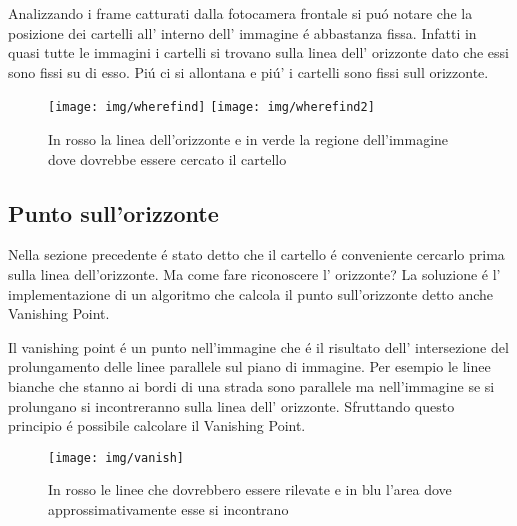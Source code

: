 		Analizzando i frame catturati dalla fotocamera frontale si pu\'o notare che la posizione dei cartelli all' interno dell' immagine \'e abbastanza fissa. Infatti in quasi tutte le immagini i cartelli si trovano sulla linea dell' orizzonte dato che essi sono fissi su di esso. Pi\'u ci si allontana e pi\'u' i cartelli sono fissi sull orizzonte.
		\begin{figure}[!ht]
			\centering
			\texttt{[image: img/wherefind]}
			\texttt{[image: img/wherefind2]}
			\caption{In rosso la linea dell'orizzonte e in verde la regione dell'immagine dove dovrebbe essere cercato il cartello}
		\end{figure}


	\subsection{Punto sull'orizzonte}

		Nella sezione precedente \'e stato detto che il cartello \'e conveniente cercarlo prima sulla linea dell'orizzonte. Ma come fare riconoscere l' orizzonte? La soluzione \'e l' implementazione di un algoritmo che calcola il punto sull'orizzonte detto anche Vanishing Point.
		
		Il vanishing point \'e un punto nell'immagine che \'e il risultato  dell' intersezione del prolungamento delle linee parallele sul piano di immagine. Per esempio le linee bianche che stanno ai bordi di una strada sono parallele ma nell'immagine se si prolungano si incontreranno sulla linea dell' orizzonte. Sfruttando questo principio \'e possibile calcolare il Vanishing Point.
		\begin{figure}[!ht]
			\centering
			\texttt{[image: img/vanish]}
			\caption{In rosso le linee che dovrebbero essere rilevate e in blu l'area dove approssimativamente esse si incontrano}
		\end{figure}

